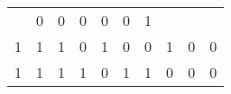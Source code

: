 \begin{tabular}{|c|c|c|c||c|c|c|c|c|c|}
    
    
    & 0
  
    
    
    & 0
  
    
    
    & 0
  
    
    
    & 0
  
    
    
    & 0
  
    
    
    & 1
   \\
  

  
  
  1 & 1 & 1 & 0
  
    
    
    & 1
  
    
    
    & 0
  
    
    
    & 0
  
    
    
    & 1
  
    
    
    & 0
  
    
    
    & 0
   \\
  

  
  
  1 & 1 & 1 & 1
  
    
    
    & 0
  
    
    
    & 1
  
    
    
    & 1
  
    
    
    & 0
  
    
    
    & 0
  
    
    
    & 0
   \\
  \hline

\end{tabular}



